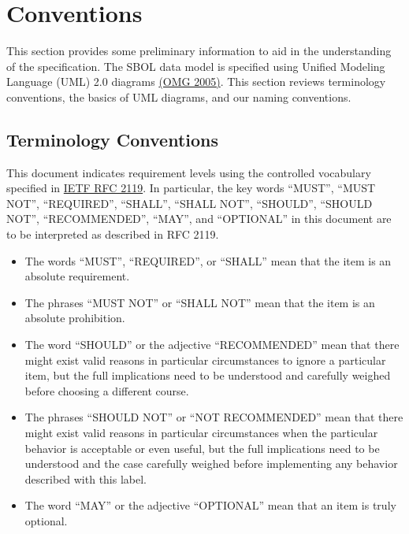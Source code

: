 \section{Conventions}

This section provides some preliminary information to aid in the understanding of the specification.
The SBOL data model is specified using Unified Modeling Language (UML) 2.0 diagrams \href{http://www.omg.org/spec/UML/2.0/}{(OMG 2005)}. This section reviews terminology conventions, the basics of UML diagrams, and our naming conventions.

\subsection{Terminology Conventions}

This document indicates requirement levels using the controlled vocabulary specified in \href{https://tools.ietf.org/html/rfc2119}{IETF RFC 2119}.
In particular, the key words ``MUST'', ``MUST NOT'', ``REQUIRED'', ``SHALL'', ``SHALL NOT'', ``SHOULD'', ``SHOULD NOT'', ``RECOMMENDED'', ``MAY'', and ``OPTIONAL'' in this document are to be interpreted as described in RFC 2119.

\begin{itemize}
\item The words ``MUST'', ``REQUIRED'', or ``SHALL'' mean that the item is an absolute requirement.
\item The phrases ``MUST NOT'' or ``SHALL NOT'' mean that the item is an absolute prohibition.
\item The word ``SHOULD'' or the adjective ``RECOMMENDED'' mean that there might exist valid reasons in particular circumstances to ignore a particular item, but the full implications need to be understood and carefully weighed before choosing a different course.
\item The phrases ``SHOULD NOT'' or ``NOT RECOMMENDED'' mean that there might exist valid reasons in particular circumstances when the particular behavior is acceptable or even useful, but the full implications need to be understood and the case carefully weighed before implementing any behavior described with this label.
\item The word ``MAY'' or the adjective ``OPTIONAL'' mean that an item is truly optional.
\end{itemize}

